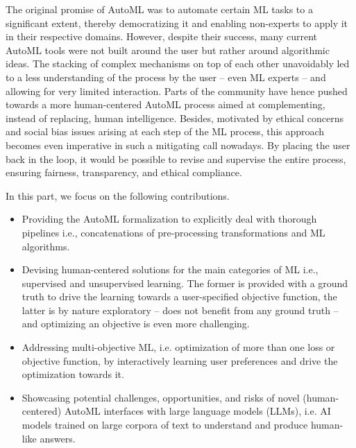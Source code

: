 The original promise of AutoML was to automate certain ML tasks to a significant extent, thereby democratizing it and enabling non-experts to apply it in their respective domains.
However, despite their success, many current AutoML tools were not built around the user but rather around algorithmic ideas.
The stacking of complex mechanisms on top of each other unavoidably led to a less understanding of the process by the user -- even ML experts -- and allowing for very limited interaction.
Parts of the community have hence pushed towards a more human-centered AutoML process aimed at complementing, instead of replacing, human intelligence.
Besides, motivated by ethical concerns and social bias issues arising at each step of the ML process, this approach becomes even imperative in such a mitigating call nowadays.
By placing the user back in the loop, it would be possible to revise and supervise the entire process, ensuring fairness, transparency, and ethical compliance.

In this part, we focus on the following contributions.
\begin{itemize}
    \item Providing the AutoML formalization to explicitly deal with thorough pipelines i.e., concatenations of pre-processing transformations and ML algorithms.
    \item Devising human-centered solutions for the main categories of ML i.e., supervised and unsupervised learning. The former is provided with a ground truth to drive the learning towards a user-specified objective function, the latter is by nature exploratory -- does not benefit from any ground truth -- and optimizing an objective is even more challenging.
    \item Addressing multi-objective ML, i.e. optimization of more than one loss or objective function, by interactively learning user preferences and drive the optimization towards it.
    \item Showcasing potential challenges, opportunities, and risks of novel (human-centered) AutoML interfaces with large language models (LLMs), i.e. AI models trained on large corpora of text to understand and produce human-like answers.
\end{itemize}

